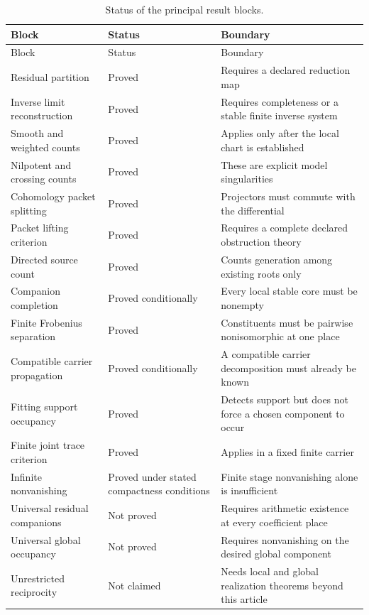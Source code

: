 \documentclass{aomart}
\theoremstyle{definition}
\theoremstyle{remark}
\begin{document}
\begin{longtable}{>{\raggedright\arraybackslash}p{}>{\raggedright\arraybackslash}p{}>{\raggedright\arraybackslash}p{}}
\caption{Status of the principal result blocks.}\label{tab:status}\\
\toprule
Block & Status & Boundary\\
\midrule
\endfirsthead
\toprule
Block & Status & Boundary\\
\midrule
\endhead
Residual partition & Proved & Requires a declared reduction map\\
Inverse limit reconstruction & Proved & Requires completeness or a stable finite inverse system\\
Smooth and weighted counts & Proved & Applies only after the local chart is established\\
Nilpotent and crossing counts & Proved & These are explicit model singularities\\
Cohomology packet splitting & Proved & Projectors must commute with the differential\\
Packet lifting criterion & Proved & Requires a complete declared obstruction theory\\
Directed source count & Proved & Counts generation among existing roots only\\
Companion completion & Proved conditionally & Every local stable core must be nonempty\\
Finite Frobenius separation & Proved & Constituents must be pairwise nonisomorphic at one place\\
Compatible carrier propagation & Proved conditionally & A compatible carrier decomposition must already be known\\
Fitting support occupancy & Proved & Detects support but does not force a chosen component to occur\\
Finite joint trace criterion & Proved & Applies in a fixed finite carrier\\
Infinite nonvanishing & Proved under stated compactness conditions & Finite stage nonvanishing alone is insufficient\\
Universal residual companions & Not proved & Requires arithmetic existence at every coefficient place\\
Universal global occupancy & Not proved & Requires nonvanishing on the desired global component\\
Unrestricted reciprocity & Not claimed & Needs local and global realization theorems beyond this article\\
\bottomrule
\end{longtable}
\end{document}
